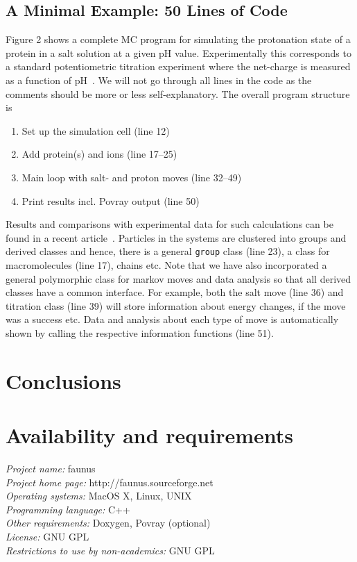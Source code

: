 \documentclass[10pt]{bmc_article}
\newenvironment{bmcformat}{\fussy\setboolean{publ}{true}}{\fussy}
\begin{document}
\begin{bmcformat}
\subsection*{A Minimal Example: 50 Lines of Code}
Figure 2 shows a complete MC program for simulating the protonation state of a protein in a salt solution at a given pH value.
Experimentally this corresponds to a standard potentiometric titration experiment where the net-charge is measured as a function of pH~\cite{tanford:72}.
We will not go through all lines in the code as the comments should be more or less self-explanatory.
The overall program structure is
\begin{enumerate}
\item Set up the simulation cell (line 12)
\item Add protein(s) and ions (line 17--25)
\item Main loop with salt- and proton moves (line 32--49)
\item Print results incl. Povray output (line 50)
\end{enumerate}
Results and comparisons with experimental data for such calculations can be found in a recent article~\cite{lund:07}.
Particles in the systems are clustered into groups and derived classes and hence, there is a general \verb"group" class (line 23), a class for macromolecules (line 17), chains etc.
Note that we have also incorporated a general polymorphic class for markov moves and data analysis so that all derived classes have a common interface.
For example, both the salt move (line 36) and titration class (line 39) will store information about energy changes, if the move was a success etc.
Data and analysis about each type of move is automatically shown by calling the respective information functions (line 51).


\section*{Conclusions}

\section*{Availability and requirements}
\textsl{Project name:} faunus\\
\textsl{Project home page:} http://faunus.sourceforge.net\\
\textsl{Operating systems:} MacOS X, Linux, UNIX\\
\textsl{Programming language:} C++\\
\textsl{Other requirements:} Doxygen, Povray (optional)\\
\textsl{License:} GNU GPL\\
\textsl{Restrictions to use by non-academics:} GNU GPL\\


\end{bmcformat}
\end{document}
